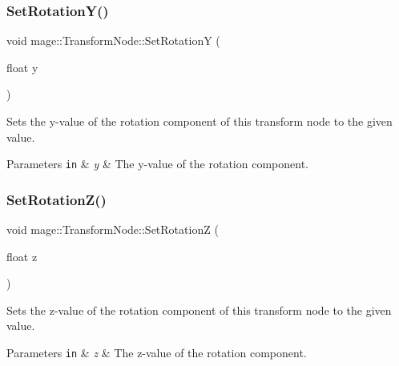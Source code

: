 \subsubsection{\texorpdfstring{Set\+Rotation\+Y()}{SetRotationY()}}
{\footnotesize\ttfamily void mage\+::\+Transform\+Node\+::\+Set\+RotationY (\begin{DoxyParamCaption}\item[{float}]{y }\end{DoxyParamCaption})\hspace{0.3cm}{\ttfamily [noexcept]}}

Sets the y-\/value of the rotation component of this transform node to the given value.


\begin{DoxyParams}[1]{Parameters}
\mbox{\tt in}  & {\em y} & The y-\/value of the rotation component. \\
\hline
\end{DoxyParams}
\hypertarget{structmage_1_1_transform_node_a0c668541d850db84f9ced7cf1bc526a5}{}\label{structmage_1_1_transform_node_a0c668541d850db84f9ced7cf1bc526a5} 
\subsubsection{\texorpdfstring{Set\+Rotation\+Z()}{SetRotationZ()}}
{\footnotesize\ttfamily void mage\+::\+Transform\+Node\+::\+Set\+RotationZ (\begin{DoxyParamCaption}\item[{float}]{z }\end{DoxyParamCaption})\hspace{0.3cm}{\ttfamily [noexcept]}}

Sets the z-\/value of the rotation component of this transform node to the given value.


\begin{DoxyParams}[1]{Parameters}
\mbox{\tt in}  & {\em z} & The z-\/value of the rotation component. \\
\hline
\end{DoxyParams}
\hypertarget{structmage_1_1_transform_node_aaa365d5baaadc9fa36c0ba96017eccfe}{}\label{structmage_1_1_transform_node_aaa365d5baaadc9fa36c0ba96017eccfe} 
